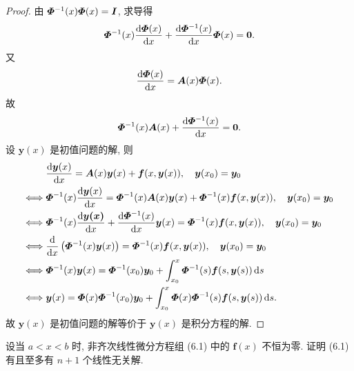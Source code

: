 \begin{proof}
  由 $\bm{\varPhi}^{-1}(x)\bm{\varPhi}(x)=\bm{I}$, 求导得
  \[\bm{\varPhi}^{-1}(x)\frac{\mathop{}\!\mathrm{d}\bm{\varPhi}(x)}{\mathop{}\!\mathrm{d} x}
    + \frac{\mathop{}\!\mathrm{d}\bm{\varPhi}^{-1}(x)}{\mathop{}\!\mathrm{d} x}\bm{\varPhi}(x)=\bm{0}.\]
  又
  \[\frac{\mathop{}\!\mathrm{d}\bm{\varPhi}(x)}{\mathop{}\!\mathrm{d} x}=\bm{A}(x)\bm{\varPhi}(x).\]
  故
  \[\bm{\varPhi}^{-1}(x)\bm{A}(x)+\frac{\mathop{}\!\mathrm{d}\bm{\varPhi}^{-1}(x)}{\mathop{}\!\mathrm{d} x}=\bm{0}.\]
  设 $\bm{y}(x)$ 是初值问题的解, 则
  \begin{align*}
  & \frac{\diff\bm{y}(x)}{\diff x}=\bm{A}(x)\bm{y}(x)+\bm{f}(x,\bm{y}(x)),\quad\bm{y}(x_0)=\bm{y}_0 \\
  \Longleftrightarrow{} & \bmitPhi^{-1}(x)\frac{\diff\bm{y}(x)}{\diff x}=\bmitPhi^{-1}(x)\bm{A}(x)\bm{y}(x)+\bmitPhi^{-1}(x)\bm{f}(x,\bm{y}(x)),\quad\bm{y}(x_0)=\bm{y}_0 \\
  \Longleftrightarrow{} & \bmitPhi^{-1}(x)\frac{\diff\bm{y(x)}}{\diff x}+\frac{\diff\bmitPhi^{-1}(x)}{\diff x}\bm{y}(x)=\bmitPhi^{-1}(x)\bm{f}(x,\bm{y}(x)),\quad\bm{y}(x_0)=\bm{y}_0 \\
  \Longleftrightarrow{} & \frac{\diff}{\diff x}\left(\bmitPhi^{-1}(x)\bm{y}(x)\right)=\bmitPhi^{-1}(x)\bm{f}(x,\bm{y}(x)),\quad\bm{y}(x_0)=\bm{y}_0 \\
  \Longleftrightarrow{} & \bmitPhi^{-1}(x)\bm{y}(x)=\bmitPhi^{-1}(x_0)\bm{y}_0+\int_{x_0}^x\bmitPhi^{-1}(s)\bm{f}(s,\bm{y}(s))\diff s \\
  \Longleftrightarrow{} & \bm{y}(x)=\bmitPhi(x)\bmitPhi^{-1}(x_0)\bm{y}_0+\int_{x_0}^x\bmitPhi(x)\bmitPhi^{-1}(s)\bm{f}(s,\bm{y}(s))\diff s.
  \end{align*}
  故 $\bm{y}(x)$ 是初值问题的解等价于 $\bm{y}(x)$ 是积分方程的解.
\end{proof}



\begin{exercise}
  设当 $a<x<b$ 时, 非齐次线性微分方程组 (6.1) 中的 $\bm{f}(x)$ 不恒为零. 
  证明 (6.1) 有且至多有 $n+1$ 个线性无关解.
\end{exercise}

